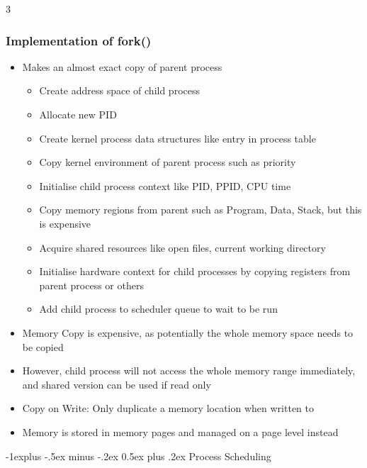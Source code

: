 \documentclass[10pt, landscape]{article}
\makeatletter
\renewcommand{\section}{\@startsection{section}{1}{0mm}%
                                {-1ex plus -.5ex minus -.2ex}%
                                {0.5ex plus .2ex}%
                                {\normalfont\large\bfseries}}
\renewcommand{\section}{\@startsection{section}{2}{0mm}%
                                {-1explus -.5ex minus -.2ex}%
                                {0.5ex plus .2ex}%
                                {\normalfont\normalsize\bfseries}}
\makeatother
\begin{document}
\begin{multicols*}{3}
\subsubsection{Implementation of fork()}
\begin{itemize}
    \item Makes an almost exact copy of parent process
    \begin{itemize}
        \item Create address space of child process
        \item Allocate new PID
        \item Create kernel process data structures like entry in process table
        \item Copy kernel environment of parent process such as priority
        \item Initialise child process context like PID, PPID, CPU time
        \item Copy memory regions from parent such as Program, Data, Stack, but this is expensive
        \item Acquire shared resources like open files, current working directory
        \item Initialise hardware context for child processes by copying registers from parent process or others
        \item Add child process to scheduler queue to wait to be run
    \end{itemize}
    \item Memory Copy is expensive, as potentially the whole memory space needs to be copied
    \item However, child process will not access the whole memory range immediately, and shared version can be used if read only
    \item Copy on Write: Only duplicate a memory location when written to
    \item Memory is stored in memory pages and managed on a page level instead
\end{itemize}

\section{Process Scheduling}


\end{multicols*}
\end{document}
